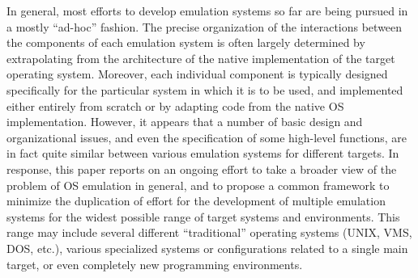 
In general, most efforts to develop emulation systems so far are being
pursued in a mostly ``ad-hoc'' fashion. The precise organization of
the interactions between the components of each emulation system is
often largely determined by extrapolating from the architecture of the
native implementation of the target operating system.  Moreover, each
individual component is typically designed specifically for the
particular system in which it is to be used, and implemented either
entirely from scratch or by adapting code from the native OS
implementation.  However, it appears that a number of basic design and
organizational issues,
and even the specification of some high-level functions, are in fact
quite similar between various emulation systems for different
targets. In response, this
paper reports on an ongoing effort to take a broader view of the
problem of OS emulation in general, 
and to propose a common framework to minimize the duplication of
effort for the development of multiple emulation systems for the
widest possible range of target systems and environments. This range
may include several different ``traditional'' operating systems (UNIX,
VMS, DOS, etc.), various specialized systems or configurations related
to a single main target, or even completely new programming
environments.



